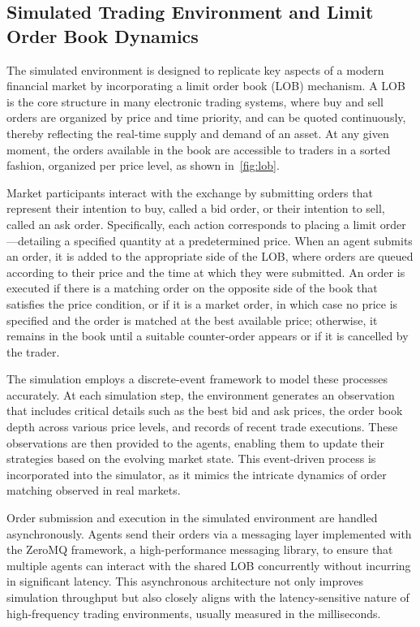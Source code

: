 \documentclass[11pt]{article}
\begin{document}
    \subsection{Simulated Trading Environment and Limit Order Book Dynamics}
    \label{subsec:environment}
    The simulated environment is designed to replicate key aspects of a modern financial market by incorporating a limit order book (LOB) mechanism.
    A LOB is the core structure in many electronic trading systems, where buy and sell orders are organized by price and time priority,
    and can be quoted continuously, thereby reflecting the real-time supply and demand of an asset.
    At any given moment, the orders available in the book are accessible to traders in a sorted fashion, organized per price level,
    as shown in~\cref{fig:lob}.

    Market participants interact with the exchange by submitting orders that represent their intention to buy, called a bid order,
    or their intention to sell, called an ask order.
    Specifically, each action corresponds to placing a limit order—detailing a specified quantity at a predetermined price.
    When an agent submits an order, it is added to the appropriate side of the LOB, where orders are queued according to their price and
    the time at which they were submitted.
    An order is executed if there is a matching order on the opposite side of the book that satisfies the price condition,
    or if it is a market order, in which case no price is specified and the order is matched at the best available price;
    otherwise, it remains in the book until a suitable counter-order appears or if it is cancelled by the trader.

    The simulation employs a discrete-event framework to model these processes accurately.
    At each simulation step, the environment generates an observation that includes critical details such as the best bid and ask prices,
    the order book depth across various price levels, and records of recent trade executions.
    These observations are then provided to the agents, enabling them to update their strategies based on the evolving market state.
    This event-driven process is incorporated into the simulator, as it mimics the intricate dynamics of order matching observed in real markets.

    Order submission and execution in the simulated environment are handled asynchronously.
    Agents send their orders via a messaging layer implemented with the ZeroMQ framework, a high-performance messaging library,
    to ensure that multiple agents can interact with the shared LOB concurrently without incurring in significant latency.
    This asynchronous architecture not only improves simulation throughput but also closely aligns with
    the latency-sensitive nature of high-frequency trading environments, usually measured in the milliseconds.
\end{document}
